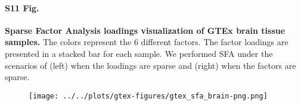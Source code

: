 \documentclass[10pt,letterpaper]{article}
\begin{document}
\paragraph*{S11 Fig.}

\label{figS11}
{\bf Sparse Factor Analysis loadings visualization of GTEx brain tissue samples.} The colors represent the 6 different factors. The factor loadings are presented in a stacked bar for each sample. We performed SFA under the scenarios of (left) when the loadings are sparse and (right) when the factors are sparse.

\begin{figure}[ht]
\centering
\texttt{[image: ../../plots/gtex-figures/gtex\_sfa\_brain-png.png]}
\end{figure}
\end{document}
